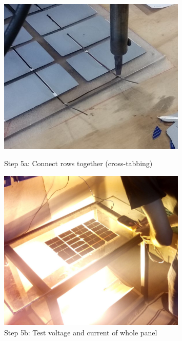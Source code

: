 \documentclass{article}
\theoremstyle{definition}
\theoremstyle{definition}
\theoremstyle{remark}
\begin{document}
  \begin{figure}[!ht]
    \begin{minipage}{0.25\textwidth}
        \centering
        \includegraphics[width=0.8\textwidth]{../Images/image_3_7_(step_5a).png}
        \caption*{Step 5a: Connect rows together (cross-tabbing)}
    \end{minipage}\hfill
    \begin{minipage}{0.25\textwidth}
        \centering
        \includegraphics[width=0.8\textwidth]{../Images/image_3_8_(step_5b).png}
        \caption*{Step 5b: Test voltage and current of whole panel}
    \end{minipage}\hfill
    \begin{minipage}{0.25\textwidth}
        \centering

\end{minipage}
\end{figure}
\end{document}
